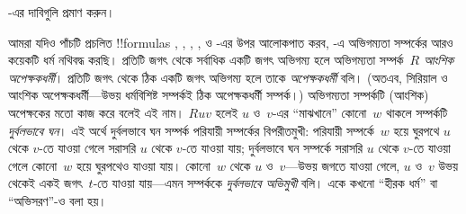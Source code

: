 \documentclass[../../../include/open-logic-section]{subfiles}
\begin{document}
\begin{prob}
  -এর দাবিগুলি প্রমাণ করুন।
\end{prob}

আমরা যদিও পাঁচটি প্রচলিত !!{formula}s ,
, , , ও -এর উপর আলোকপাত করব, -এ অভিগম্যতা সম্পর্কের আরও কয়েকটি ধর্ম নথিবদ্ধ করছি। প্রতিটি জগৎ থেকে সর্বাধিক একটি জগৎ অভিগম্য হলে অভিগম্যতা সম্পর্ক~$R$ \emph{আংশিক অপেক্ষকধর্মী}। প্রতিটি জগৎ থেকে ঠিক একটি জগৎ অভিগম্য হলে তাকে \emph{অপেক্ষকধর্মী} বলি। (অতএব, সিরিয়াল ও আংশিক অপেক্ষকধর্মী—উভয় ধর্মবিশিষ্ট সম্পর্কই ঠিক অপেক্ষকধর্মী সম্পর্ক।) অভিগম্যতা সম্পর্কটি (আংশিক) অপেক্ষকের মতো কাজ করে বলেই এই নাম। $Ruv$ হলেই $u$ ও~$v$-এর ``মাঝখানে'' কোনো~$w$ থাকলে সম্পর্কটি \emph{দুর্বলভাবে ঘন}। এই অর্থে দুর্বলভাবে ঘন সম্পর্ক পরিযায়ী সম্পর্কের বিপরীতমুখী: পরিযায়ী সম্পর্কে~$w$ হয়ে ঘুরপথে $u$ থেকে $v$-তে যাওয়া গেলে সরাসরি $u$ থেকে $v$-তে যাওয়া যায়; দুর্বলভাবে ঘন সম্পর্কে সরাসরি $u$ থেকে $v$-তে যাওয়া গেলে কোনো~$w$ হয়ে ঘুরপথেও যাওয়া যায়। কোনো~$w$ থেকে $u$ ও~$v$—উভয় জগতে যাওয়া গেলে, $u$ ও~$v$ উভয় থেকেই একই জগৎ~$t$-তে যাওয়া যায়—এমন সম্পর্ককে \emph{দুর্বলভাবে অভিমুখী} বলি। একে কখনো ``হীরক ধর্ম'' বা ``অভিসরণ''-ও বলা হয়।
\end{document}

